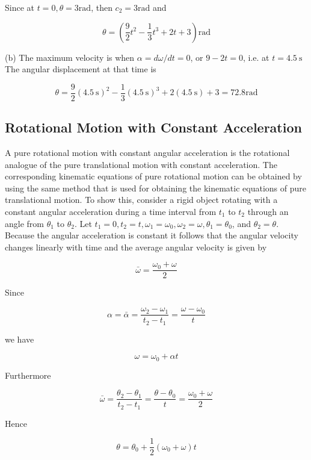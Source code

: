 \documentclass[10pt]{article}
\numberwithin{equation}{section}
\begin{document}
Since at $t=0, \theta=3 \mathrm{rad}$, then $c_{2}=3 \mathrm{rad}$ and

$$
\theta=\left(\frac{9}{2} t^{2}-\frac{1}{3} t^{3}+2 t+3\right) \mathrm{rad}
$$

(b) The maximum velocity is when $\alpha=d \omega / d t=0$, or $9-2 t=0$, i.e. at $t=4.5 \mathrm{~s}$ The angular displacement at that time is

$$
\theta=\frac{9}{2}(4.5 \mathrm{~s})^{2}-\frac{1}{3}(4.5 \mathrm{~s})^{3}+2(4.5 \mathrm{~s})+3=72.8 \mathrm{rad}
$$

\subsection{Rotational Motion with Constant Acceleration}\label{sec:7-3}
A pure rotational motion with constant angular acceleration is the rotational analogue of the pure translational motion with constant acceleration. The corresponding kinematic equations of pure rotational motion can be obtained by using the same method that is used for obtaining the kinematic equations of pure translational motion. To show this, consider a rigid object rotating with a constant angular acceleration during a time interval from $t_{1}$ to $t_{2}$ through an angle from $\theta_{1}$ to $\theta_{2}$. Let $t_{1}=0, t_{2}=t, \omega_{1}=\omega_{0}, \omega_{2}=\omega, \theta_{1}=\theta_{0}$, and $\theta_{2}=\theta$. Because the angular acceleration is constant it follows that the angular velocity changes linearly with time and the average angular velocity is given by

$$
\bar{\omega}=\frac{\omega_{0}+\omega}{2}
$$

Since

$$
\alpha=\bar{\alpha}=\frac{\omega_{2}-\omega_{1}}{t_{2}-t_{1}}=\frac{\omega-\omega_{0}}{t}
$$

we have


\begin{equation}
\omega=\omega_{0}+\alpha t \label{eq:7-1}
\end{equation}


Furthermore

$$
\bar{\omega}=\frac{\theta_{2}-\theta_{1}}{t_{2}-t_{1}}=\frac{\theta-\theta_{0}}{t}=\frac{\omega_{0}+\omega}{2}
$$

Hence


\begin{equation}
\theta=\theta_{0}+\frac{1}{2}\left(\omega_{0}+\omega\right) t \label{eq:7-2}
\end{equation}
\end{document}
